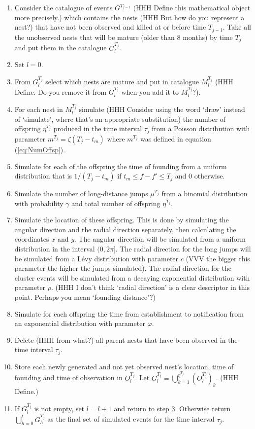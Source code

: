 \documentclass{article}
\begin{document}
\begin{enumerate}
    \item Consider the catalogue of events $G^{T_{j-1}}$ (HHH Define this mathematical object more precisely.) which contains the nests (HHH But how do you represent a nest?) that have not been observed and killed at or before time $T_{j-1}$. Take all the unobserved nests that will be mature (older than 8 months) by time $T_j$ and put them in the catalogue $G_l^{T_j}$.
    \item Set $l = 0$.
    \item From $G_l^{T_j}$ select which nests are mature and put in catalogue $M_l^{T_j}$ (HHH Define. Do you remove it from $G_l^{T_j}$ when you add it to $M_l^{T_j}$?).
    \item For each nest in $M_l^{T_j}$ simulate (HHH Consider using the word `draw' instead of `simulate', where that's an appropriate substitution) the number of offspring $\eta^{T_j}$ produced in the time interval $\tau_j$ from a Poisson distribution with parameter $ m^{T_j} = \zeta (T_j-t_m)$ where $m^{T_j}$ was defined in equation (\ref{eq:NumOffsp}).
    \item Simulate for each of the offspring the time of founding from a uniform distribution that is $1/(T_j-t_m)$ if $t_m \leq f - f' \leq T_j$ and $0$ otherwise.
    \item Simulate the number of long-distance jumps $\mu^{T_j}$ from a binomial distribution with probability $\gamma$ and total number of offspring $\eta^{T_j}$.
    \item Simulate the location of these offspring. This is done by simulating the angular direction and the radial direction separately, then calculating the coordinates $x$ and $y$. The angular direction will be simulated from a uniform distribution in the interval $(0, 2\pi]$. The radial direction for the long jumps will be simulated from a L\'evy distribution with parameter $c$ (VVV the bigger this parameter the higher the jumps simulated). The radial direction for the cluster events will be simulated from a decaying exponential distribution with parameter $\rho$. (HHH I don't think `radial direction' is a clear descriptor in this point. Perhaps you mean `founding distance'?)
    \item Simulate for each offspring the time from establishment to notification from an exponential distribution with parameter $\varphi$.
    \item Delete (HHH from what?) all parent nests that have been observed in the time interval $\tau_j$.
    \item Store each newly generated and not yet observed nest's location, time of founding and time of observation in $O_l^{T_j}$. Let $G_{l}^{T_j} = \bigcup_{k=1}^{\eta^{T_j}} (O_l^{T_j})_k$. (HHH Define.)
    \item If $G_l^{T_j}$ is not empty, set $l = l+1$ and return to step 3. Otherwise return $\bigcup_{h=0}^l G^{T_j}_h$ as the final set of simulated events for the time interval $\tau_j$.
\end{enumerate}
\end{document}
